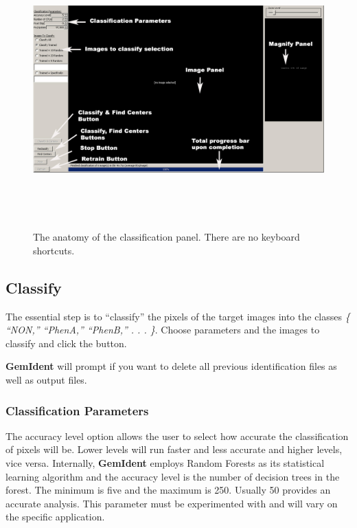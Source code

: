 \documentclass[12pt]{article}
\begin{document}
\begin{figure}[htp]
\centering
\includegraphics[width=476pt,height=281pt]{classification.jpg}
\label{fig:classification}
\caption{\sf The anatomy of the classification panel. There are no keyboard shortcuts.}
\end{figure}

\subsection{Classify}

The essential step is to ``classify'' the pixels of the target images into the classes {\em \{ ``NON,'' ``PhenA,'' ``PhenB,'' . . . \}}. Choose parameters and the images to classify and click the  button.

{\bf GemIdent} will prompt if you want to delete all previous identification files as well as output files.
 
\subsubsection{Classification Parameters}

The {\sf accuracy level} option allows the user to select how accurate the classification of pixels will be. Lower levels will run faster and less accurate and higher levels, vice versa. Internally, {\bf GemIdent} employs Random Forests as its statistical learning algorithm and the {\sf accuracy level} is the number of decision trees in the forest. The minimum is five and the maximum is 250. Usually 50 provides an accurate analysis. This parameter must be experimented with and will vary on the specific application.
\end{document}
